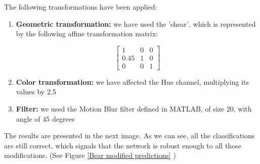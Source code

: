 \documentclass[a4paper]{iacas}
\begin{document}
\subsubsection{}
The following transformations have been applied:

\begin{enumerate}
\item \textbf{Geometric transformation: } we have used the 'shear', which is represented by the following affine transformation matrix:

\begin{equation*}
\left[
\begin{matrix}
1 & 0 & 0 \\
0.45 & 1 & 0 \\
0 & 0 & 1
\end{matrix}
\right]
\end{equation*}

\item \textbf{Color transformation: } we have affected the Hue channel, multiplying its values by 2.5
\item \textbf{Filter: } we used the Motion Blur filter defined in MATLAB, of size 20, with angle of 45 degrees
\end{enumerate}

The results are presented in the next image. As we can see, all the classifications are still correct, which signals that the network is robust enough to all those modifications. (See Figure  \ref{Bear modified predictions} )
\end{document}
